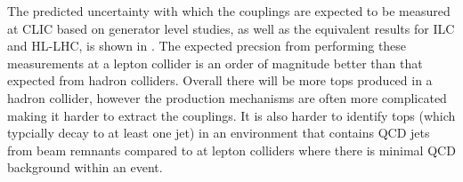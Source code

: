 The predicted uncertainty with which the couplings are expected to be measured at \ac{CLIC} based on generator level studies, as well as the equivalent results for \ac{ILC} and \ac{HL-LHC}, is shown in . The expected precsion from performing these measurements at a lepton collider is an order of magnitude better than that expected from hadron colliders. Overall there will be more tops produced in a hadron collider, however the production mechanisms are often more complicated making it harder to extract the couplings. It is also harder to identify tops (which typcially decay to at least one jet) in an environment that contains \ac{QCD} jets from beam remnants compared to at lepton colliders where there is minimal \ac{QCD} background within an event.

